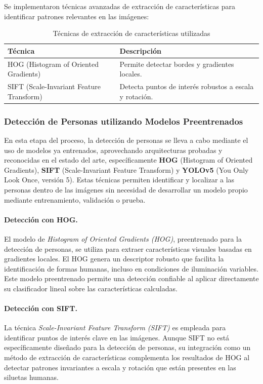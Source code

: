 Se implementaron técnicas avanzadas de extracción de características para identificar patrones relevantes en las imágenes:

\begin{table}[H]
\centering
\caption{Técnicas de extracción de características utilizadas}
\label{table:features}
\begin{tabular}{|l|p{10cm}|}
\hline
\textbf{Técnica} & \textbf{Descripción} \\ \hline
HOG (Histogram of Oriented Gradients) & Permite detectar bordes y gradientes locales. \\ \hline
SIFT (Scale-Invariant Feature Transform) & Detecta puntos de interés robustos a escala y rotación. \\ \hline
\end{tabular}
\end{table}

\subsubsection{Detección de Personas utilizando Modelos Preentrenados}

En esta etapa del proceso, la detección de personas se lleva a cabo mediante el uso de modelos ya entrenados, aprovechando arquitecturas probadas y reconocidas en el estado del arte, específicamente \textbf{HOG} (Histogram of Oriented Gradients), \textbf{SIFT} (Scale-Invariant Feature Transform) y \textbf{YOLOv5} (You Only Look Once, versión 5). Estas técnicas permiten identificar y localizar a las personas dentro de las imágenes sin necesidad de desarrollar un modelo propio mediante entrenamiento, validación o prueba. 

\paragraph{Detección con HOG.} El modelo de \textit{Histogram of Oriented Gradients (HOG)}, preentrenado para la detección de personas, se utiliza para extraer características visuales basadas en gradientes locales. El HOG genera un descriptor robusto que facilita la identificación de formas humanas, incluso en condiciones de iluminación variables. Este modelo preentrenado permite una detección confiable al aplicar directamente su clasificador lineal sobre las características calculadas.

\paragraph{Detección con SIFT.} La técnica \textit{Scale-Invariant Feature Transform (SIFT)} es empleada para identificar puntos de interés clave en las imágenes. Aunque SIFT no está específicamente diseñado para la detección de personas, su integración como un método de extracción de características complementa los resultados de HOG al detectar patrones invariantes a escala y rotación que están presentes en las siluetas humanas.

